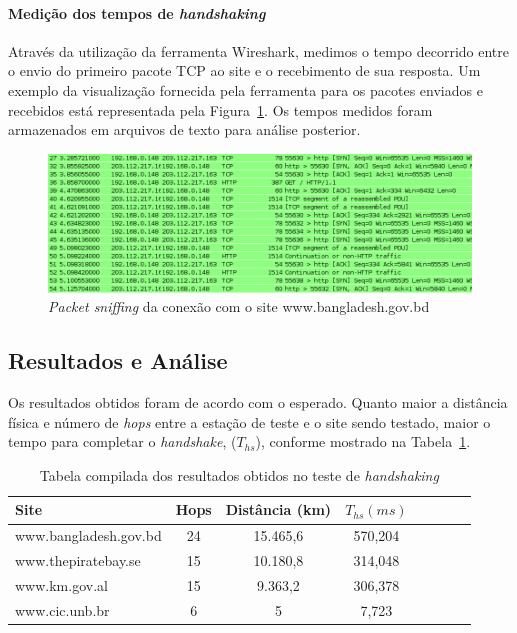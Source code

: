 \documentclass[12pt,a4paper]{report}
\begin{document}
\paragraph{Medição dos tempos de \textit{handshaking}} Através da utilização da ferramenta Wireshark, medimos o tempo decorrido entre o envio do primeiro pacote TCP ao site e o recebimento de sua resposta. Um exemplo da visualização fornecida pela ferramenta para os pacotes enviados e recebidos está representada pela Figura~\ref{fig:wirebangladesh}. Os tempos medidos foram armazenados em arquivos de texto para análise posterior.

\begin{figure}[h]
\centering
\includegraphics[width=\textwidth]{bangladesh.png}
\caption{\textit{Packet sniffing} da conexão com o site www.bangladesh.gov.bd}
\label{fig:wirebangladesh}
\end{figure}

\subsection{Resultados e Análise}

Os resultados obtidos foram de acordo com o esperado. Quanto maior a distância física e número de \textit{hops} entre a estação de teste e o site sendo testado, maior o tempo para completar o \textit{handshake}, (\(T_{hs}\)), conforme mostrado na Tabela~\ref{tab:resultshandshaking}.

\begin{table}[h]
	\center
	\begin{tabular}{l*{6}{c}r}
	Site						& Hops	& Distância (km)	& \(T_{hs} (ms)\)\\
	\hline
	www.bangladesh.gov.bd		& 24		& 15.465,6		& 570,204\\
	www.thepiratebay.se		& 15		& 10.180,8		& 314,048\\
	www.km.gov.al				& 15		& 9.363,2			& 306,378\\
	www.cic.unb.br				& 6		& 5				& 7,723\\
	\end{tabular}
	\caption{Tabela compilada dos resultados obtidos no teste de \textit{handshaking}}
	\label{tab:resultshandshaking}
\end{table}
\end{document}
